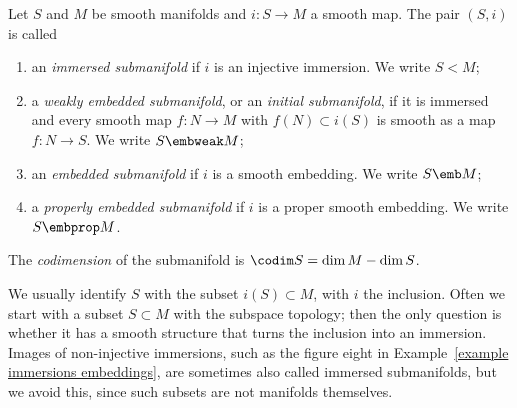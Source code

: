 \begin{defn}[Submanifolds]
    Let $S$ and $M$ be smooth manifolds and $i:S\to M$ a smooth map. The pair $(S,i)$ is called
    \begin{enumerate}
        \item an \emph{immersed submanifold} if $i$ is an injective immersion. We write $S<M$;\index{$<$}
        \item a \emph{weakly embedded submanifold}, or an \emph{initial submanifold}, if it is immersed and every smooth map $f:N\to M$ with $f(N)\subset i(S)$ is smooth as a map $f:N\to S$. We write $S\embweak M$;
        \item an \emph{embedded submanifold} if $i$ is a smooth embedding. We write $S\emb M$;\index{$\emb$}
        \item a \emph{properly embedded submanifold} if $i$ is a proper smooth embedding. We write $S\embprop M$.\index{$\embprop$}
    \end{enumerate}
    The \emph{codimension} of the submanifold is $\codim S=\dim M-\dim S$.
\end{defn}
We usually identify $S$ with the subset $i(S)\subset M$, with $i$ the inclusion. Often we start with a subset $S\subset M$ with the subspace topology; then the only question is whether it has a smooth structure that turns the inclusion into an immersion. Images of non-injective immersions, such as the figure eight in Example~\ref{example immersions embeddings}, are sometimes also called immersed submanifolds, but we avoid this, since such subsets are not manifolds themselves.

